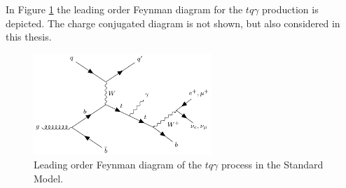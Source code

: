 In Figure \ref{fig:feyn_tqGamma} the leading order Feynman diagram for the $tq\gamma$ production is depicted. The charge conjugated diagram is not shown, but also considered in this thesis.
\begin{figure}
    \centering
    \includegraphics[width=0.6\textwidth]{Plots/s4_feyn_nom.pdf}
    \caption{Leading order Feynman diagram of the $tq\gamma$ process in the Standard Model.}
    \label{fig:feyn_tqGamma}
\end{figure}